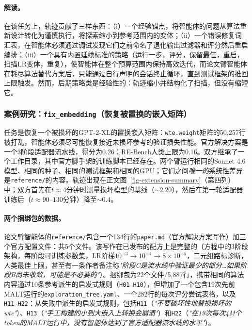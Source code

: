 \paragraph{解读。}
在该任务上，轨迹贡献了三样东西：（i）一个经验锚点，将智能体的问题从算法重新设计转化为谨慎执行，将探索缩小到参考范围内的变体；（ii）一个错误修复词汇表，在智能体必须通过调试发现它们之前命名了退化输出过滤器和评分然后重启编排；（iii）一个具有内置延续标准的策略（运行一步，评分，保留最佳，重启，扫描LR变体，重复），使\ara{}智能体在整个预算范围内保持高效迭代，而论文臂智能体在耗尽算法替代方案后，只能通过自行声明的会话终止循环，直到测试框架的推回上限触发。然而，后期策略类是经验性的：轨迹缩小并结构化了扫描，但没有缩短它。

\subsubsection{案例研究：\texttt{fix\_embedding}（恢复被置换的嵌入矩阵）}
\label{sec-eval-extension-fixembed}

任务是恢复一个被损坏的GPT-2-XL的置换嵌入矩阵：\texttt{wte.weight}矩阵的50{,}257行被打乱，智能体必须尽可能恢复接近未损坏参考的验证损失性能。官方解决方案是一个3阶段适配器流水线，得分为0.26；RE-Bench人类上限为0.16。双方继承了一个工作目录，其中官方脚手架的训练脚本已经存在。两个臂运行相同的Sonnet 4.6模型、相同的种子、相同的测试框架和相同的GPU；它们之间\emph{唯一的}系统性差异是\texttt{reference/}的内容。轨迹出现在正文图~\ref{fig-extension-summary}（第四列）中；双方首先在$t \approx 4$分钟时测量损坏模型的基线（${\sim}2.20$），然后在第一轮适配器训练后（$t \approx 90$--$130$分钟）降至${\sim}0.4$。

\paragraph{两个捆绑包的数据。}
论文臂智能体的\texttt{reference/}包含一个134行的\texttt{paper.md}（官方解决方案写作）加三个官方配置文件：共5个文件。该写作在已发布的配方上是完整的（方程中的3阶段架构，每阶段可训练参数集，LR阶梯$10^{-3} \to 10^{-4} \to 8\times 10^{-5}$，二元组路标诊断，人类最佳上限，甚至有一条作者备注称\emph{"阶段C是流水线中验证最少的部分…如果阶段B尚未收敛，可能是不必要的"}）。\ara{}捆绑包为22个文件/5{,}887行，携带相同的算法内容通过10条参考派生的启发式规则（\texttt{H01}--\texttt{H10}），但增加了一个包含19次先前MALT运行的\texttt{exploration\_tree.yaml}、一个282行的每次评分尝试表格，以及\texttt{H11}--\texttt{H22}：从失败中派生的启发式规则，包括\texttt{H11}（\emph{"不要破坏性地替换损坏的wte"}）、\texttt{H13}（\emph{"手工构建的小到大嵌入上转换会崩溃"}）和\texttt{H22}（\emph{"在19次每次4M个token的MALT运行中，没有智能体达到了官方适配器流水线的水平"}）。

